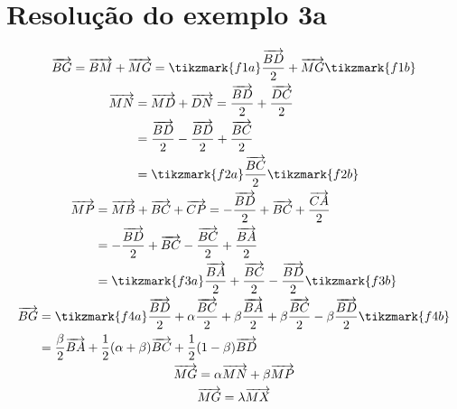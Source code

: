 \documentclass[brazilian, fleqn]{article}
\renewcommand{\vec}[1]{\overrightarrow{#1}}
\begin{document}
\section{Resolução do exemplo 3a}

\begin{gather}
    \vec{BG}= \vec{BM}+\vec{MG}=\tikzmark{f1a} \frac{\vec{BD}}{2}+\vec{MG} \tikzmark{f1b} \\
    \begin{aligned}[t]
        \vec{MN}&=\vec{MD}+\vec{DN} =\frac{\vec{BD}}{2}+\frac{\vec{DC}}{2} \\
                &=\frac{\vec{BD}}{2}-\frac{\vec{BD}}{2}+\frac{\vec{BC}}{2} \\
                &=\tikzmark{f2a} \frac{\vec{BC}}{2} \tikzmark{f2b}
    \end{aligned} \\
    \begin{aligned}[t]
        \vec{MP}&=\vec{MB}+\vec{BC}+\vec{CP}=-\frac{\vec{BD}}{2}+\vec{BC}+\frac{\vec{CA}}{2} \\
                &=-\frac{\vec{BD}}{2}+\vec{BC}-\frac{\vec{BC}}{2}+\frac{\vec{BA}}{2} \\
                &=\tikzmark{f3a} \frac{\vec{BA}}{2}+\frac{\vec{BC}}{2}-\frac{\vec{BD}}{2} \tikzmark{f3b}
    \end{aligned} \\
    \begin{aligned}[t]
        \vec{BG}&=\tikzmark{f4a} \frac{\vec{BD}}{2}+\alpha \frac{\vec{BC}}{2}+\beta \frac{\vec{BA}}{2}+\beta \frac{\vec{BC}}{2}-\beta \frac{\vec{BD}}{2} \tikzmark{f4b} \\
                &=\frac{\beta}{2}\vec{BA}+\frac{1}{2}(\alpha+\beta)\vec{BC}+\frac{1}{2}(1-\beta)\vec{BD}
    \end{aligned} \\
    \vec{MG}=\alpha \vec{MN}+\beta \vec{MP} \\
    \vec{MG}=\lambda \vec{MX} \\

\end{gather}
\end{document}
